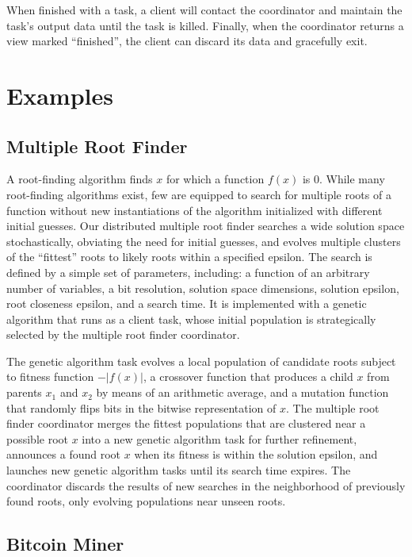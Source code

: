 \documentclass [11pt, twocolumn] {article}
\begin{document}
When finished with a task, a client will contact the coordinator and maintain the task's output data until the task is killed. Finally, when the coordinator returns a view marked ``finished'', the client can discard its data and gracefully exit. 

\section {Examples}

\subsection {Multiple Root Finder} 

\newcommand{\abs}[1]{\lvert{#1}\rvert}

A root-finding algorithm finds $x$ for which a function $f(x)$ is 0. While many root-finding algorithms exist, few are equipped to search for multiple roots of a function without new instantiations of the algorithm initialized with different initial guesses. Our distributed multiple root finder searches a wide solution space stochastically, obviating the need for initial guesses, and evolves multiple clusters of the ``fittest'' roots to likely roots within a specified epsilon. The search is defined by a simple set of parameters, including: a function of an arbitrary number of variables, a bit resolution, solution space dimensions, solution epsilon, root closeness epsilon, and a search time. It is implemented with a genetic algorithm that runs as a client task, whose initial population is strategically selected by the multiple root finder coordinator.

The genetic algorithm task evolves a local population of candidate roots subject to fitness function $-\abs{f(x)}$, a crossover function that produces a child $x$ from parents $x_1$ and $x_2$ by means of an arithmetic average, and a mutation function that randomly flips bits in the bitwise representation of $x$. The multiple root finder coordinator merges the fittest populations that are clustered near a possible root $x$ into a new genetic algorithm task for further refinement, announces a found root $x$ when its fitness is within the solution epsilon, and launches new genetic algorithm tasks until its search time expires. The coordinator discards the results of new searches in the neighborhood of previously found roots, only evolving populations near unseen roots.

\subsection {Bitcoin Miner}
\end{document}
